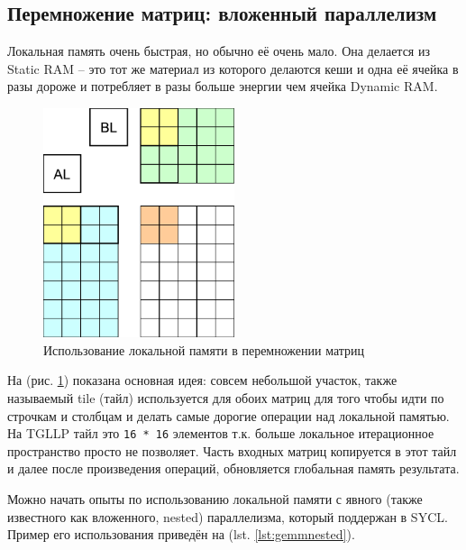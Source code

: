 \documentclass[a4paper,12pt,oneside]{article}
\begin{document}
\subsection{Перемножение матриц: вложенный параллелизм}\label{subsec:gemmnested}

Локальная память очень быстрая, но обычно её очень мало. Она делается из Static RAM -- это тот же материал из которого делаются кеши и одна её ячейка в разы дороже и потребляет в разы больше энергии чем ячейка Dynamic RAM.

\begin{figure}
\centering
\includegraphics[width=0.5\textwidth]{pictures/iter-space-matrix-cache.pdf}
\caption{Использование локальной памяти в перемножении матриц}
\label{fig:gemmlocal}
\end{figure}

На (рис. \ref{fig:gemmlocal}) показана основная идея: совсем небольшой участок, также называемый tile (тайл) используется для обоих матриц для того чтобы идти по строчкам и столбцам и делать самые дорогие операции над локальной памятью.
На TGLLP тайл это \lstinline!16 * 16! элементов т.к. больше локальное итерационное пространство просто не позволяет.
Часть входных матриц копируется в этот тайл и далее после произведения операций, обновляется глобальная память результата.

Можно начать опыты по использованию локальной памяти с явного (также известного как вложенного, nested) параллелизма, который поддержан в SYCL.
Пример его использования приведён на (lst. \ref{lst:gemmnested}).
\end{document}

